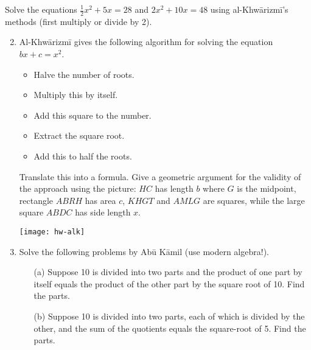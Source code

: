 \begin{exercises}{}{}
\exstart %
  Solve the equations $\frac 12x^2+5x=28$ and $2x^2+10x=48$ using al-Khwārizmī's methods (first multiply or divide by 2).
  
\begin{enumerate}\setcounter{enumi}{1}
  \item%
  \label{exs:alkalgebra}
  Al-Khwārizmī gives the following algorithm for solving the equation $bx+c=x^2$.\\
  \begin{minipage}[t]{0.6\linewidth}\vspace{0pt}
  \begin{itemize}\itemsep0pt
    \item Halve the number of roots.
    \item Multiply this by itself.
    \item Add this square to the number.
    \item Extract the square root.
    \item Add this to half the roots.
  \end{itemize}
  Translate this into a formula. Give a geometric argument for the validity of the approach using the picture: $HC$ has length $b$ where $G$ is the midpoint, rectangle $ABRH$ has area $c$, $KHGT$ and $AMLG$ are squares, while the large square $ABDC$ has side length $x$.
  \end{minipage}\hfill\begin{minipage}[t]{0.39\linewidth}\vspace{0pt}
  \flushright\texttt{[image: hw-alk]}
  \end{minipage}
  
  
  \item%
  Solve the following problems by Abū Kāmil (use modern algebra!).
  \begin{itemize}
    \item[(a)] Suppose 10 is divided into two parts and the product of one part by itself equals the product of the other part by the square root of 10. Find the parts.
    \item[(b)] Suppose 10 is divided into two parts, each of which is divided by the other, and the sum of the quotients equals the square-root of 5. Find the parts.
  \end{itemize}
\end{enumerate}
\end{exercises}

\clearpage



